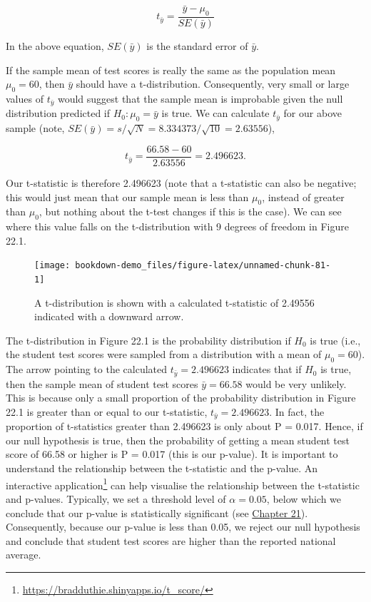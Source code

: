 \documentclass[
  openany]{krantz}
\begin{document}
\[t_{\bar{y}} = \frac{\bar{y} - \mu_{0}}{SE(\bar{y})}\]

In the above equation, \(SE(\bar{y})\) is the standard error of \(\bar{y}\).

If the sample mean of test scores is really the same as the population mean \(\mu_{0} = 60\), then \(\bar{y}\) should have a t-distribution.
Consequently, very small or large values of \(t_{\bar{y}}\) would suggest that the sample mean is improbable given the null distribution predicted if \(H_{0}: \mu_{0} = \bar{y}\) is true.
We can calculate \(t_{\bar{y}}\) for our above sample (note, \(SE(\bar{y}) = s/\sqrt{N} = 8.334373 / \sqrt{10} = 2.63556\)),

\[t_{\bar{y}} = \frac{66.58 - 60}{2.63556} = 2.496623.\]

Our t-statistic is therefore 2.496623 (note that a t-statistic can also be negative; this would just mean that our sample mean is less than \(\mu_{0}\), instead of greater than \(\mu_{0}\), but nothing about the t-test changes if this is the case).
We can see where this value falls on the t-distribution with 9 degrees of freedom in Figure 22.1.

\begin{figure}
\texttt{[image: bookdown-demo\_files/figure-latex/unnamed-chunk-81-1]} \caption{A t-distribution is shown with a calculated t-statistic of 2.49556 indicated with a downward arrow.}\label{fig:unnamed-chunk-81}
\end{figure}

The t-distribution in Figure 22.1 is the probability distribution if \(H_{0}\) is true (i.e., the student test scores were sampled from a distribution with a mean of \(\mu_{0} = 60\)).
The arrow pointing to the calculated \(t_{\bar{y}} = 2.496623\) indicates that if \(H_{0}\) is true, then the sample mean of student test scores \(\bar{y} = 66.58\) would be very unlikely.
This is because only a small proportion of the probability distribution in Figure 22.1 is greater than or equal to our t-statistic, \(t_{\bar{y}} = 2.496623\).
In fact, the proportion of t-statistics greater than 2.496623 is only about P = 0.017.
Hence, if our null hypothesis is true, then the probability of getting a mean student test score of 66.58 or higher is P = 0.017 (this is our p-value).
It is important to understand the relationship between the t-statistic and the p-value.
An interactive application\footnote{\url{https://bradduthie.shinyapps.io/t_score/}} can help visualise the relationship between the t-statistic and p-values.
Typically, we set a threshold level of \(\alpha = 0.05\), below which we conclude that our p-value is statistically significant (see \protect\hyperlink{Chapter_21}{Chapter 21}).
Consequently, because our p-value is less than 0.05, we reject our null hypothesis and conclude that student test scores are higher than the reported national average.
\end{document}
